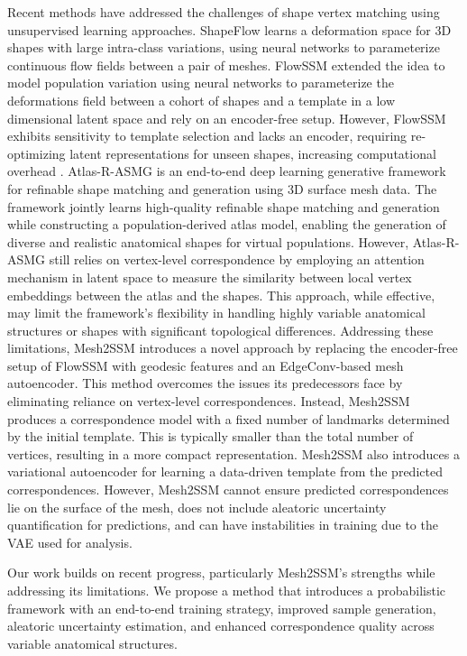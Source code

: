 Recent methods have addressed the challenges of shape vertex matching using unsupervised learning approaches. ShapeFlow \cite{jiang2020shapeflow} learns a deformation space for 3D shapes with large intra-class variations, using neural networks to parameterize continuous flow fields between a pair of meshes. FlowSSM \cite{ludke2022landmark} extended the idea to model population variation using neural networks to parameterize the deformations field between a cohort of shapes and a template in a low dimensional latent space and rely on an encoder-free setup. However, FlowSSM exhibits sensitivity to template selection and lacks an encoder, requiring re-optimizing latent representations for unseen shapes, increasing computational overhead \cite{iyer2023mesh2ssm}. Atlas-R-ASMG \cite{kalaie2024end} is an end-to-end deep learning generative framework for refinable shape matching and generation using 3D surface mesh data. The framework jointly learns high-quality refinable shape matching and generation while constructing a population-derived atlas model, enabling the generation of diverse and realistic anatomical shapes for virtual populations. However, Atlas-R-ASMG still relies on vertex-level correspondence by employing an attention mechanism in latent space to measure the similarity between local vertex embeddings between the atlas and the shapes. This approach, while effective, may limit the framework's flexibility in handling highly variable anatomical structures or shapes with significant topological differences. Addressing these limitations, Mesh2SSM \cite{iyer2023mesh2ssm} introduces a novel approach by replacing the encoder-free setup of FlowSSM with geodesic features and an EdgeConv-based \cite{wang2019dynamic} mesh autoencoder. This method overcomes the issues its predecessors face by eliminating reliance on vertex-level correspondences. Instead, Mesh2SSM produces a correspondence model with a fixed number of landmarks determined by the initial template. This is typically smaller than the total number of vertices, resulting in a more compact representation. Mesh2SSM also introduces a variational autoencoder \cite{kingma2019introduction} for learning a data-driven template from the predicted correspondences. However, Mesh2SSM cannot ensure predicted correspondences lie on the surface of the mesh, does not include aleatoric uncertainty quantification for predictions, and can have instabilities in training due to the VAE used for analysis. 

Our work builds on recent progress, particularly Mesh2SSM's strengths while addressing its limitations. We propose a method that introduces a probabilistic framework with an end-to-end training strategy, improved sample generation, aleatoric uncertainty estimation, and enhanced correspondence quality across variable anatomical structures.